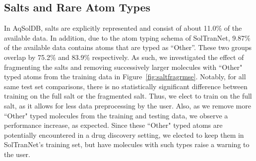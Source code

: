 \documentclass[journal=jmcmar,manuscript=article]{achemso}
\begin{document}
\subsection{Salts and Rare Atom Types}
In AqSolDB, salts are explicitly represented and consist of about 11.0\% of the available data.
In addition, due to the atom typing schema of SolTranNet, 9.87\% of the available data contains atoms that are typed as ``Other''.
These two groups overlap by 75.2\% and 83.9\% respectively.
As such, we investigated the effect of fragmenting the salts and removing successively larger molecules with ``Other" typed atoms from the training data in Figure~\ref{fig:saltfragrmse}.
Notably, for all same test set comparisons, there is no statistically significant difference between training on the full salt or the fragmented salt.
Thus, we elect to train on the full salt, as it allows for less data preprocessing by the user.
Also, as we remove more ``Other" typed molecules from the training and testing data, we observe a performance increase, as expected.
Since these ``Other" typed atoms are potentially encountered in a drug discovery setting, we elected to keep them in SolTranNet's training set, but have molecules with such types raise a warning to the user.
\end{document}
